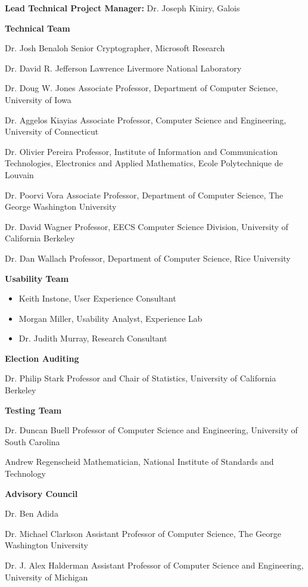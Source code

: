\textbf{Lead Technical Project Manager:} Dr. Joseph Kiniry, Galois

\textbf{Technical Team}

Dr. Josh Benaloh
Senior Cryptographer, Microsoft Research
 
Dr. David R. Jefferson
Lawrence Livermore National Laboratory
 
Dr. Doug W. Jones
Associate Professor, Department of Computer Science, University of Iowa
 
Dr. Aggelos Kiayias
Associate Professor, Computer Science and Engineering, University of Connecticut
 
Dr. Olivier Pereira
Professor, Institute of Information and Communication Technologies, Electronics and Applied Mathematics, Ecole Polytechnique de Louvain
 
Dr. Poorvi Vora
Associate Professor, Department of Computer Science, The George Washington University
 
Dr. David Wagner
Professor, EECS Computer Science Division, University of California Berkeley
 
Dr. Dan Wallach
Professor, Department of Computer Science, Rice University
 
\textbf{Usability Team}

\begin{itemize}
\item Keith Instone, User Experience Consultant
\item Morgan Miller, Usability Analyst, Experience Lab
\item Dr. Judith Murray, Research Consultant
\end{itemize}

\textbf{Election Auditing}

Dr. Philip Stark
Professor and Chair of Statistics, University of California Berkeley
 
\textbf{Testing Team}

Dr. Duncan Buell
Professor of Computer Science and Engineering, University of South Carolina
 
Andrew Regenscheid
Mathematician, National Institute of Standards and Technology
 
\textbf{Advisory Council}

Dr. Ben Adida
 
Dr. Michael Clarkson
Assistant Professor of Computer Science, The George Washington University
 
Dr. J. Alex Halderman
Assistant Professor of Computer Science and Engineering, University of Michigan
 
